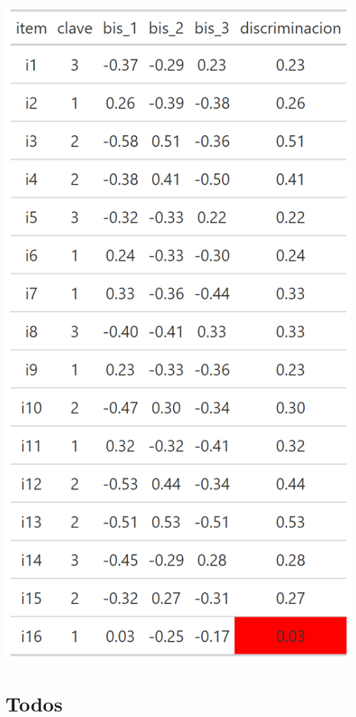 \documentclass[
  letterpaper,
  DIV=11,
  numbers=noendperiod]{scrreprt}
\begin{document}
\begin{center}
\includegraphics[width=0.6\linewidth,height=\textheight,keepaspectratio]{images/teoria_clasica_disc_insuficiente.png}
\end{center}

\section{Todos}
\end{document}

